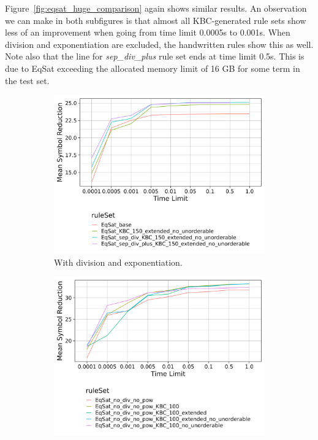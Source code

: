 Figure~\ref{fig:eqsat_huge_comparison} again shows similar results. An observation we can make in both subfigures is that almost all KBC-generated rule sets show less of an improvement when going from time limit 0.0005s to 0.001s. When division and exponentiation are excluded, the handwritten rules show this as well. Note also that the line for \emph{sep\_div\_plus} rule set ends at time limit 0.5s. This is due to EqSat exceeding the allocated memory limit of 16 GB for some term in the test set.

\begin{figure}[h]
	\centering
	\begin{subfigure}[t]{0.48\textwidth}
		\includegraphics[width=\linewidth]{img/by_rule_set_random_terms_huge.png}
		\caption{With division and exponentiation.}
		\label{fig:eqsat_huge_with_div}
	\end{subfigure}\hfill
	\begin{subfigure}[t]{0.48\textwidth}
		\includegraphics[width=\linewidth]{img/by_rule_set_no_div_no_pow_random_terms_huge.png}

\end{subfigure}
\end{figure}
